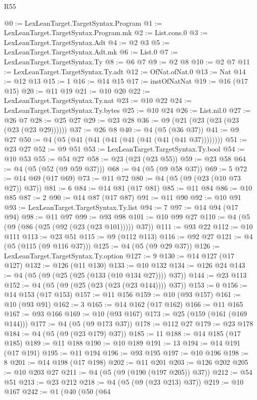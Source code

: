 \begin{lexlean}{R55}
\begin{coremodule}
@0 := LexLeanTarget.TargetSyntax.Program
@1 := LexLeanTarget.TargetSyntax.Program.mk
@2 := List.cons.{0}
@3 := LexLeanTarget.TargetSyntax.Adt
@4 := @2 @3
@5 := LexLeanTarget.TargetSyntax.Adt.mk
@6 := List.{0}
@7 := LexLeanTarget.TargetSyntax.Ty
@8 := @6 @7
@9 := @2 @8
@10 := @2 @7
@11 := LexLeanTarget.TargetSyntax.Ty.adt
@12 := OfNat.ofNat.{0}
@13 := Nat
@14 := @12 @13
@15 := 1
@16 := @14 @15
@17 := instOfNatNat
@19 := @16 (@17 @15)
@20 := @11 @19
@21 := @10 @20
@22 := LexLeanTarget.TargetSyntax.Ty.nat
@23 := @10 @22
@24 := LexLeanTarget.TargetSyntax.Ty.bytes
@25 := @10 @24
@26 := List.nil.{0}
@27 := @26 @7
@28 := @25 @27
@29 := @23 @28
@36 := @9 (@21 (@23 (@23 (@23 (@23 (@23 @29))))))
@37 := @26 @8
@40 := @4 (@5 (@36 @37))
@41 := @9 @27
@50 := @4 (@5 (@41 (@41 (@41 (@41 (@41 (@41 (@41 @37))))))))
@51 := @23 @27
@52 := @9 @51
@53 := LexLeanTarget.TargetSyntax.Ty.bool
@54 := @10 @53
@55 := @54 @27
@58 := @23 (@23 (@23 @55))
@59 := @23 @58
@64 := @4 (@5 (@52 (@9 @59 @37)))
@68 := @4 (@5 (@9 @58 @37))
@69 := 5
@72 := @14 @69 (@17 @69)
@73 := @11 @72
@80 := @4 (@5 (@9 (@23 (@10 @73 @27)) @37))
@81 := 6
@84 := @14 @81 (@17 @81)
@85 := @11 @84
@86 := @10 @85
@87 := 2
@90 := @14 @87 (@17 @87)
@91 := @11 @90
@92 := @10 @91
@93 := LexLeanTarget.TargetSyntax.Ty.list
@94 := 7
@97 := @14 @94 (@17 @94)
@98 := @11 @97
@99 := @93 @98
@101 := @10 @99 @27
@110 := @4 (@5 (@9 (@86 (@25 (@92 (@23 (@23 @101))))) @37))
@111 := @93 @22
@112 := @10 @111
@113 := @23 @51
@115 := @9 (@112 @113)
@116 := @92 @27
@121 := @4 (@5 (@115 (@9 @116 @37)))
@125 := @4 (@5 (@9 @29 @37))
@126 := LexLeanTarget.TargetSyntax.Ty.option
@127 := 9
@130 := @14 @127 (@17 @127)
@132 := @126 (@11 @130)
@133 := @10 @132
@134 := @126 @24
@143 := @4 (@5 (@9 (@25 (@25 (@133 (@10 @134 @27)))) @37))
@144 := @23 @113
@152 := @4 (@5 (@9 (@25 (@23 (@23 (@23 @144)))) @37))
@153 := 0
@156 := @14 @153 (@17 @153)
@157 := @11 @156
@159 := @10 (@93 @157)
@161 := @10 (@93 @91)
@162 := 3
@165 := @14 @162 (@17 @162)
@166 := @11 @165
@167 := @93 @166
@169 := @10 (@93 @167)
@173 := @25 (@159 (@161 (@169 @144)))
@177 := @4 (@5 (@9 @173 @37))
@178 := @112 @27
@179 := @23 @178
@184 := @4 (@5 (@9 (@23 @179) @37))
@185 := 11
@188 := @14 @185 (@17 @185)
@189 := @11 @188
@190 := @10 @189
@191 := 13
@194 := @14 @191 (@17 @191)
@195 := @11 @194
@196 := @93 @195
@197 := @10 @196
@198 := 8
@201 := @14 @198 (@17 @198)
@202 := @11 @201
@203 := @126 @202
@205 := @10 @203 @27
@211 := @4 (@5 (@9 (@190 (@197 @205)) @37))
@212 := @54 @51
@213 := @23 @212
@218 := @4 (@5 (@9 (@23 @213) @37))
@219 := @10 @167
@242 := @1
    (@40
      (@50
        (@64

\end{coremodule}
\end{lexlean}
